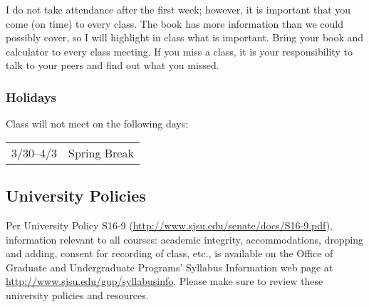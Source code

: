 \documentclass[letterpaper,12pt,fleqn]{article}
\begin{document}
I do not take attendance after the first week; however, it is important that you come (on time) to every class. The
book has more information than we could possibly cover, so I will highlight in class what is important. Bring your
book and calculator to every class meeting. If you miss a class, it is your responsibility to talk to your peers
and find out what you missed.

\subsubsection*{Holidays}

Class will not meet on the following days:

\begin{tabular}{cl}
  3/30--4/3 & Spring Break
\end{tabular}

\subsection*{University Policies}

Per University Policy S16-9 (\url{http://www.sjsu.edu/senate/docs/S16-9.pdf}), information relevant to all courses:
academic integrity, accommodations, dropping and adding, consent for recording of class, etc., is available on the
Office of Graduate and Undergraduate Programs’ Syllabus Information web page at
\url{http://www.sjsu.edu/gup/syllabusinfo}.  Please make sure to review these university policies and resources.
\end{document}
